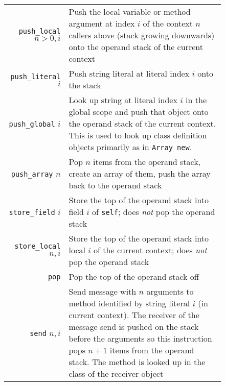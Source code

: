\documentclass[11pt]{article}
\begin{document}
\begin{figure}
\begin{center}
\begin{tabular}[t]{r | l}
{\tt push\_local} $n > 0, i$ & \begin{minipage}[t]{.76\linewidth}Push the local variable or method argument at index $i$ of the  context $n$ callers above (stack growing downwards) onto the operand stack of the current context\end{minipage} \\

{\tt push\_literal} $i$ & \begin{minipage}[t]{.76\linewidth} Push string literal at literal index $i$ onto the stack\end{minipage} \\

{\tt push\_global} $i$  & \begin{minipage}[t]{.76\linewidth} Look up string at literal index $i$ in the global scope and push that object onto the operand stack of the current context. This is used to look up class definition objects primarily as in {\tt Array new}. \end{minipage} \\

{\tt push\_array} $n$  & \begin{minipage}[t]{.76\linewidth}Pop $n$ items from the operand stack, create an array of them, push the array back to the operand stack\end{minipage} \\

{\tt store\_field} $i$ & \begin{minipage}[t]{.76\linewidth}Store the top of the operand stack into field $i$ of {\tt self}; does {\em not} pop the operand stack\end{minipage} \\

{\tt store\_local} $n,i$ & \begin{minipage}[t]{.76\linewidth}Store the top of the operand stack into local $i$ of the current context; does {\em not} pop the operand stack\end{minipage} \\

{\tt pop} & \begin{minipage}[t]{.76\linewidth}Pop the top of the operand stack off\end{minipage} \\
\hline

{\tt send} $n,i$ & \begin{minipage}[t]{.76\linewidth} Send message with $n$ arguments to method identified by string literal $i$ (in current context). The receiver of the message send is pushed on the stack before the arguments so this instruction pops $n+1$ items from the operand stack. The method is looked up in the class of the receiver object\end{minipage} \\


\end{tabular}
\end{center}
\end{figure}
\end{document}
